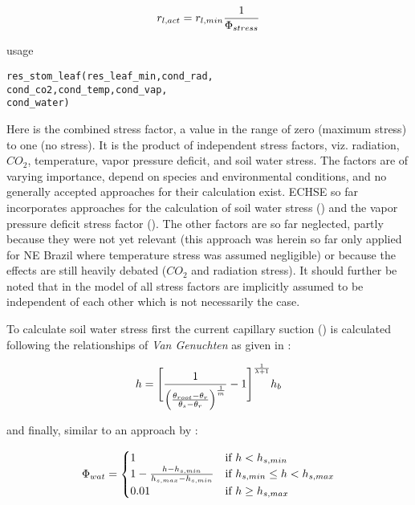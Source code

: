 \begin{equation} \label{eqn:et:res:jarvis}
r_{l,act} = r_{l,min} \frac{1}{\Phi_{stress}}
\end{equation}

\noindent
usage
\begin{verbatim}
res_stom_leaf(res_leaf_min,cond_rad,
cond_co2,cond_temp,cond_vap,
cond_water)
\end{verbatim}

Here \condStress{} is the combined stress factor, a value in the range of zero (maximum stress) to one (no stress). It is the product of independent stress factors, viz. radiation, $CO_2$, temperature, vapor pressure deficit, and soil water stress. The factors are of varying importance, depend on species and environmental conditions, and no generally accepted approaches for their calculation exist. ECHSE so far incorporates approaches for the calculation of soil water stress (\condSoilWat{}) and the vapor pressure deficit stress factor (\condVapPress{}). The other factors are so far neglected, partly because they were not yet relevant (this approach was herein so far only applied for NE Brazil where temperature stress was assumed negligible) or because the effects are still heavily debated ($CO_2$ and radiation stress). It should further be noted that in the model of \citet{Jarvis1976} all stress factors are implicitly assumed to be independent of each other which is not necessarily the case.

To calculate soil water stress first the current capillary suction (\capilSuc{}) is calculated following the relationships of \emph{Van Genuchten} as given in \citet{Maidment1993}:

\begin{equation} \label{eqn:et:res:stress_suc}
h = \Biggl[ \frac{1}{\Bigl( \frac{\theta_{root} - \theta_r}{\theta_s - \theta_r} \Bigr)^{\frac{1}{m}}} - 1 \Biggr]^{\frac{1}{\lambda + 1}} h_b
\end{equation}

\noindent
and finally, similar to an approach by \citet{Hanan1997}:

\begin{equation} \label{eqn:et:res:stress_wat}
\Phi_{wat} = 
\begin{cases}
1 & \mbox{if } h < h_{s,min} \\
1 - \frac{h - h_{s,min}}{h_{s,max} - h_{s,min}} & \mbox{if } h_{s,min} \leq h < h_{s,max} \\
0.01 & \mbox{if } h \geq h_{s,max}
\end{cases}
\end{equation}

